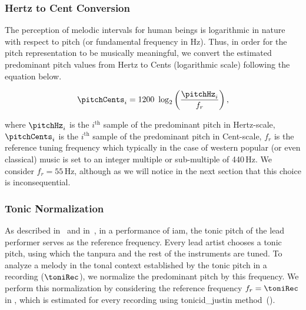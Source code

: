 {\subsubsection{Hertz to Cent Conversion}
\label{sec:data_processing_cent_conversion}

The perception of melodic intervals for human beings is logarithmic in nature with respect to pitch (or fundamental frequency in Hz). Thus, in order for the pitch representation to be musically meaningful, we convert the estimated predominant pitch values from Hertz to Cents (logarithmic scale) following the equation below.

\begin{equation}
\label{eq:hertz_to_cent_conversion}	
\pitchCents_i = 1200~\log_2\left(\frac{\pitchHz_i}{f_r}\right) ,
\end{equation}

\noindent where $\pitchHz_i$ is the $i^\mathrm{th}$ sample of the predominant pitch in Hertz-scale, $\pitchCents_i$ is the $i^\mathrm{th}$ sample of the predominant pitch in Cent-scale, $f_r$ is the reference tuning frequency which typically in the case of western popular (or even classical) music is set to an integer multiple or sub-multiple of 440\,Hz. We consider $f_r=55$\,Hz, although as we will notice in the next section that this choice is inconsequential.
  

\subsubsection{Tonic Normalization}
\label{sec:tonic_normalization}

As described in~ and in~, in a performance of \gls{iam}, the tonic pitch of the lead performer serves as the reference frequency. Every lead artist chooses a tonic pitch, using which the \gls{tanpura} and the rest of the instruments are tuned. To analyze a melody in the tonal context established by the tonic pitch in a recording ($\toniRec$), we normalize the predominant pitch by this frequency. We perform this normalization by considering the reference frequency $f_r=\toniRec$ in , which is estimated for every recording using \acrshort{tonicid_justin} method~().


\section{}
\label{sec:pre_processing_nyas_segmentation}

}
